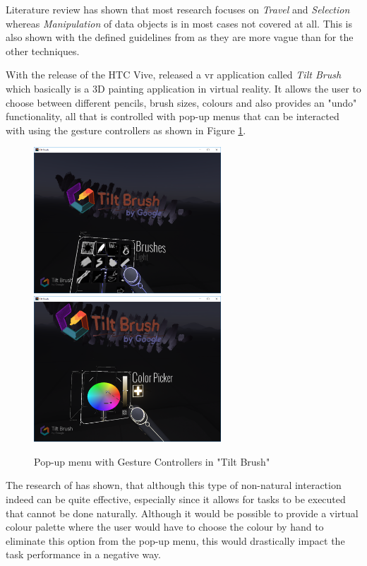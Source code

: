 Literature review has shown that most research focuses on \textit{Travel} and \textit{Selection} whereas \textit{Manipulation} of data objects is in most cases not covered at all. This is also shown with the defined guidelines from \cite{Bowman2002} as they are more vague than for the other techniques.

With the release of the HTC Vive, \cite{Google2016} released a \gls{vr} application called \textit{Tilt Brush} which basically is a 3D painting application in virtual reality. It allows the user to choose between different pencils, brush sizes, colours and also provides an "undo" functionality, all that is controlled with pop-up menus that can be interacted with using the gesture controllers as shown in Figure \ref{fig:tiltBrushMenus}.
\begin{figure}[h]
	\begin{center}
		\includegraphics[width=7cm]{03_Figures/05_LitReview/Google2016_TiltBrush.png}
		\includegraphics[width=7cm]{03_Figures/05_LitReview/Google2016_TiltBrush2.png}
		\caption[Pop-up menu with Gesture Controllers in "Tilt Brush"]{Pop-up menu with Gesture Controllers in "Tilt Brush" \citep{Google2016}}
		\label{fig:tiltBrushMenus}
	\end{center}
\end{figure} \newline
The research of \cite{Bowman2002} has shown, that although this type of non-natural interaction indeed can be quite effective, especially since it allows for tasks to be executed that cannot be done naturally. Although it would be possible to provide a virtual colour palette where the user would have to choose the colour by hand to eliminate this option from the pop-up menu, this would drastically impact the task performance in a negative way.


